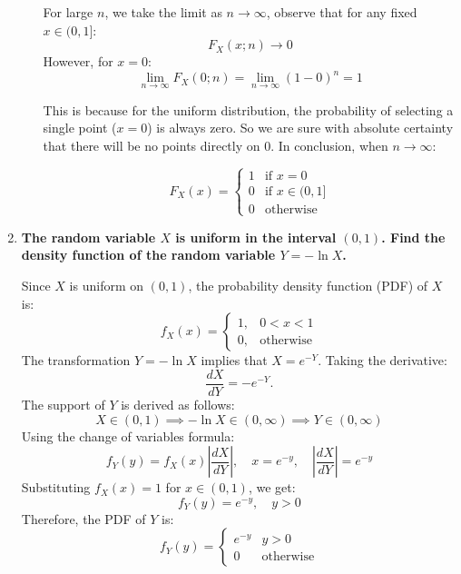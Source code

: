 \documentclass[a4paper, 8pt]{article}
\begin{document}
\begin{enumerate}[label=\alph*)]
\begin{enumerate}[label=\roman*)]
                    For large $n$, we take the limit as $n \to \infty$, observe that for any fixed $x \in (0, 1]$:
                    \[
                        F_X(x;n) \to 0
                    \]
                    However, for $x = 0$:
                    \[
                        \lim_{n \to \infty }F_X(0;n) = \lim_{n \to \infty }(1 - 0)^n = 1
                    \]


                    This is because for the uniform distribution, the probability of selecting a single point ($x=0$) is always zero. So we are sure with absolute certainty that there will be no points directly on $0$. In conclusion, when $n \to \infty$:

                    \[
                        F_X(x) =
                        \begin{cases}
                            1 & \text{if } x = 0        \\
                            0 & \text{if } x \in (0, 1] \\
                            0 & \text{otherwise}
                        \end{cases}
                    \]
          \end{enumerate}
    \item \textbf{The random variable $X$ is uniform in the interval $(0, 1)$. Find the density function of the random variable $Y = -\ln X$.}

          Since $X$ is uniform on $(0, 1)$, the probability density function (PDF) of $X$ is:
          \[
              f_X(x) =
              \begin{cases}
                  1, & 0 < x < 1        \\
                  0, & \text{otherwise}
              \end{cases}
          \]
          The transformation $Y = -\ln X$ implies that $X = e^{-Y}$. Taking the derivative:
          \[
              \frac{dX}{dY} = -e^{-Y}.
          \]
          The support of $Y$ is derived as follows:
          \[
              X \in (0, 1) \implies -\ln X \in (0, \infty) \implies Y \in (0, \infty)
          \]
          Using the change of variables formula:
          \[
              f_Y(y) = f_X(x) \left| \frac{dX}{dY} \right|, \quad x = e^{-y}, \quad \left| \frac{dX}{dY} \right| = e^{-y}
          \]
          Substituting \( f_X(x) = 1 \) for \( x \in (0, 1) \), we get:
          \[
              f_Y(y) = e^{-y}, \quad y > 0
          \]
          Therefore, the PDF of $Y$ is:
          \[
              f_Y(y) =
              \begin{cases}
                  e^{-y} & y > 0            \\
                  0      & \text{otherwise}
              \end{cases}
          \]


\end{enumerate}
\end{document}
